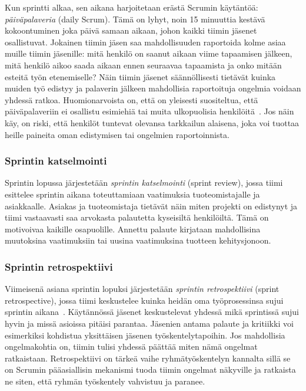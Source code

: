 \documentclass[finnish]{../tktltiki2}
\theoremstyle{definition}
\theoremstyle{remark}
\begin{document}
Kun sprintti alkaa, sen aikana harjoitetaan erästä Scrumin käytäntöä:
\emph{päiväpalaveria} (daily Scrum). Tämä on lyhyt, noin 15 minuuttia kestävä kokoontuminen joka päivä samaan aikaan, johon
kaikki tiimin jäsenet osallistuvat. Jokainen tiimin jäsen saa
mahdollisuuden raportoida kolme asiaa muille tiimin jäsenille:
mitä henkilö on saanut aikaan viime tapaamisen jälkeen, mitä henkilö
aikoo saada aikaan ennen seuraavaa tapaamista ja onko mitään
esteitä työn etenemiselle? Näin tiimin jäsenet säännöllisesti tietävät
kuinka muiden työ edistyy ja palaverin jälkeen mahdollisia raportoituja
ongelmia voidaan yhdessä ratkoa. Huomionarvoista on, että on yleisesti
suositeltua, että päiväpalaveriin ei osallistu esimiehiä tai muita
ulkopuolisia henkilöitä~\cite{ScrumHandBook}. Jos näin käy, on riski,
että henkilöt tuntevat olevansa tarkkailun alaisena, joka voi
tuottaa heille paineita oman edistymisen tai ongelmien raportoinnista.

\subsubsection{Sprintin katselmointi}

Sprintin lopussa järjestetään \emph{sprintin katselmointi} (sprint review), jossa tiimi esittelee sprintin aikana toteuttamiaan
vaatimuksia tuoteomistajalle ja asiakkaalle. Asiakas ja tuoteomistaja
tietävät näin miten projekti on edistynyt ja tiimi vastaavasti saa
arvokasta palautetta kyseisiltä henkilöiltä. Tämä on motivoivaa
kaikille osapuolille. Annettu palaute kirjataan mahdollisina muutoksina
vaatimuksiin tai uusina vaatimuksina tuotteen kehitysjonoon.

\subsubsection{Sprintin retrospektiivi}

Viimeisenä asiana sprintin lopuksi järjestetään \emph{sprintin retrospektiivi}
(sprint retrospective), jossa tiimi keskustelee kuinka heidän
oma työprosessinsa sujui sprintin aikana~\cite{Scrumprimer}. Käytännössä jäsenet
keskustelevat yhdessä mikä sprintissä sujui hyvin ja missä
asioissa pitäisi parantaa. Jäsenien antama palaute ja kritiikki
voi esimerkiksi kohdistua yksittäisen jäsenen työskentelytapoihin.
Jos mahdollisia ongelmakohtia on, tiimin tulisi yhdessä päättää
miten nämä ongelmat ratkaistaan. Retrospektiivi on tärkeä vaihe
ryhmätyöskentelyn kannalta sillä se on Scrumin pääasiallisin
mekanismi tuoda tiimin ongelmat näkyville ja ratkaista ne siten,
että ryhmän työskentely vahvistuu ja paranee.\\
\end{document}
